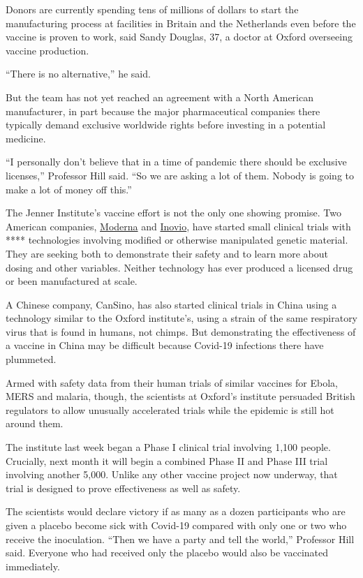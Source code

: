 Donors are currently spending tens of millions of dollars to start the
manufacturing process at facilities in Britain and the Netherlands even
before the vaccine is proven to work, said Sandy Douglas, 37, a doctor
at Oxford overseeing vaccine production.

``There is no alternative,'' he said.

But the team has not yet reached an agreement with a North American
manufacturer, in part because the major pharmaceutical companies there
typically demand exclusive worldwide rights before investing in a
potential medicine.

``I personally don't believe that in a time of pandemic there should be
exclusive licenses,'' Professor Hill said. ``So we are asking a lot of
them. Nobody is going to make a lot of money off this.''

The Jenner Institute's vaccine effort is not the only one showing
promise. Two American companies,
\href{https://www.nytimes.com/2020/03/16/health/coronavirus-vaccine.html}{Moderna}
and
\href{https://www.nytimes.com/2020/01/28/health/coronavirus-vaccine.html}{Inovio},
have started small clinical trials with **** technologies involving
modified or otherwise manipulated genetic material. They are seeking
both to demonstrate their safety and to learn more about dosing and
other variables. Neither technology has ever produced a licensed drug or
been manufactured at scale.

A Chinese company, CanSino, has also started clinical trials in China
using a technology similar to the Oxford institute's, using a strain of
the same respiratory virus that is found in humans, not chimps. But
demonstrating the effectiveness of a vaccine in China may be difficult
because Covid-19 infections there have plummeted.

Armed with safety data from their human trials of similar vaccines for
Ebola, MERS and malaria, though, the scientists at Oxford's institute
persuaded British regulators to allow unusually accelerated trials while
the epidemic is still hot around them.

The institute last week began a Phase I clinical trial involving 1,100
people. Crucially, next month it will begin a combined Phase II and
Phase III trial involving another 5,000. Unlike any other vaccine
project now underway, that trial is designed to prove effectiveness as
well as safety.

The scientists would declare victory if as many as a dozen participants
who are given a placebo become sick with Covid-19 compared with only one
or two who receive the inoculation. ``Then we have a party and tell the
world,'' Professor Hill said. Everyone who had received only the placebo
would also be vaccinated immediately.

